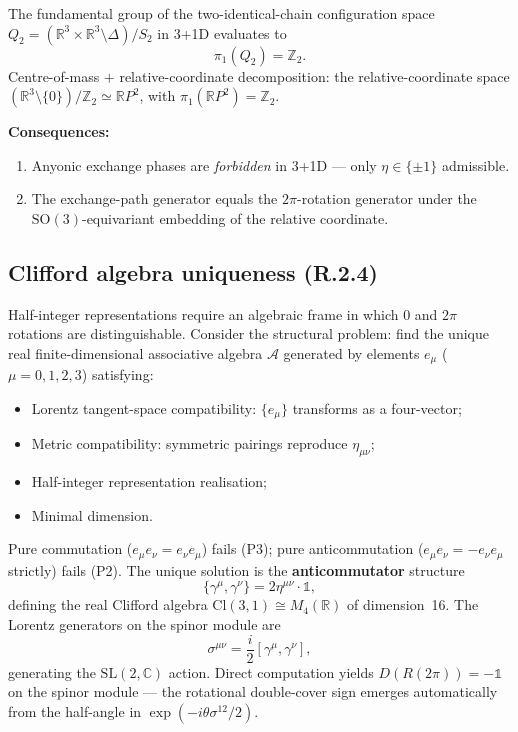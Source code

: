 \documentclass[11pt,a4paper]{article}
\begin{document}
The fundamental group of the two-identical-chain configuration space $Q_2 = (\mathbb{R}^3 \times \mathbb{R}^3 \setminus \Delta)/S_2$ in 3+1D evaluates to
\begin{equation}
\pi_1(Q_2) = \mathbb{Z}_2.
\label{eq:pi1}
\end{equation}
Centre-of-mass $+$ relative-coordinate decomposition: the relative-coordinate space $(\mathbb{R}^3 \setminus \{0\})/\mathbb{Z}_2 \simeq \mathbb{R}P^2$, with $\pi_1(\mathbb{R}P^2) = \mathbb{Z}_2$.

\textbf{Consequences:}
\begin{enumerate}
  \item Anyonic exchange phases are \emph{forbidden} in 3+1D --- only $\eta \in \{\pm 1\}$ admissible.
  \item The exchange-path generator equals the $2\pi$-rotation generator under the $\mathrm{SO}(3)$-equivariant embedding of the relative coordinate.
\end{enumerate}

\subsection{Clifford algebra uniqueness (R.2.4)}

Half-integer representations require an algebraic frame in which $0$ and $2\pi$ rotations are distinguishable. Consider the structural problem: find the unique real finite-dimensional associative algebra $\mathcal{A}$ generated by elements $e_\mu$ ($\mu = 0,1,2,3$) satisfying:
\begin{itemize}
  \item[(P1)] Lorentz tangent-space compatibility: $\{e_\mu\}$ transforms as a four-vector;
  \item[(P2)] Metric compatibility: symmetric pairings reproduce $\eta_{\mu\nu}$;
  \item[(P3)] Half-integer representation realisation;
  \item[(P4)] Minimal dimension.
\end{itemize}
Pure commutation ($e_\mu e_\nu = e_\nu e_\mu$) fails (P3); pure anticommutation ($e_\mu e_\nu = -e_\nu e_\mu$ strictly) fails (P2). The unique solution is the \textbf{anticommutator} structure
\begin{equation}
\boxed{\{\gamma^\mu, \gamma^\nu\} = 2 \eta^{\mu\nu} \cdot \mathbb{1},}
\label{eq:Cliff}
\end{equation}
defining the real Clifford algebra $\mathrm{Cl}(3,1) \cong M_4(\mathbb{R})$ of dimension~16. The Lorentz generators on the spinor module are
\begin{equation}
\sigma^{\mu\nu} = \frac{i}{2} [\gamma^\mu, \gamma^\nu],
\end{equation}
generating the $\mathrm{SL}(2,\mathbb{C})$ action. Direct computation yields $D(R(2\pi)) = -\mathbb{1}$ on the spinor module --- the rotational double-cover sign emerges automatically from the half-angle in $\exp(-i\theta\sigma^{12}/2)$.
\end{document}
